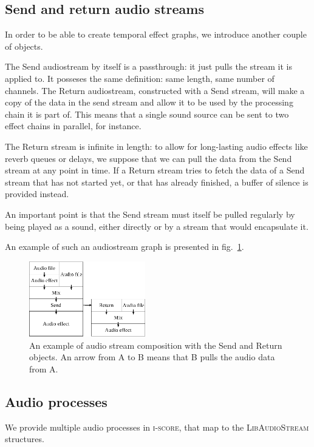 \documentclass{article}
\newcommand*{\LibAudioStream}{\textsc{LibAudioStream}\xspace}
\newcommand*{\iscore}{\textsc{i-score}\xspace}
\begin{document}
\subsection{Send and return audio streams}
In order to be able to create temporal effect graphs, we introduce another couple of objects.

The Send audiostream by itself is a passthrough: it just pulls the stream it is applied to.
It posseses the same definition: same length, same number of channels.
The Return audiostream, constructed with a Send stream, will make a copy of the data in 
the send stream and allow it to be used by the processing chain it is part of.
This means that a single sound source can be sent to two effect chains in parallel, for instance.

The Return stream is infinite in length: to allow for long-lasting audio effects 
like reverb queues or delays, we suppose that we can pull the data from the Send stream at any point in time.
If a Return stream tries to fetch the data of a Send stream that has not started yet, or that has already finished, a buffer of silence is provided instead.

An important point is that the Send stream must itself be pulled regularly by being played as a sound, either directly or by a stream that would encapsulate it.

An example of such an audiostream graph is presented in fig.~\ref{fig.mixsendreturn}.

\begin{figure}[h]
	\centering
	\includegraphics[width=0.45\textwidth]{figures/graph2.eps}
	\caption{An example of audio stream composition with the Send and Return objects. An arrow from A to B means that B pulls the audio data from A.}
	\label{fig.mixsendreturn}
\end{figure}

\subsection{Audio processes}
\label{sec.processes}
We provide multiple audio processes in \iscore, that map 
to the \LibAudioStream structures.
\end{document}

